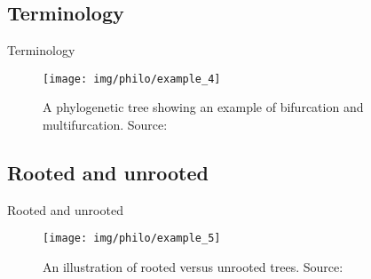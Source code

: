 \documentclass[10pt]{beamer}
\newcommand{\1}{
	\setbeamertemplate{background}{
		\texttt{[image: img/1]}
		\tikz[overlay] \fill[fill opacity=0.75,fill=white] (0,0) rectangle (-\paperwidth,\paperheight);
	}
}
\begin{document}
\subsection{Terminology}

\begin{frame}{Terminology}{}
	\begin{figure}
		\texttt{[image: img/philo/example\_4]}
		\caption{A phylogenetic tree showing an example of	bifurcation and multifurcation. Source: \cite{xiong2006essential}}			
	\end{figure}
\end{frame}

\subsection{Rooted and unrooted}

\begin{frame}{Rooted and unrooted}{}
	\begin{figure}
		\texttt{[image: img/philo/example\_5]}
		\caption{An illustration of rooted versus unrooted trees. Source: \cite{xiong2006essential}}			
	\end{figure}
\end{frame}
\end{document}

